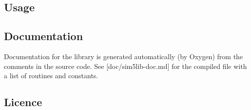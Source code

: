 \subsection*{Usage}

\subsection*{Documentation}

Documentation for the library is generated automatically (by Oxygen) from the comments in the source code. See \mbox{[}doc/sim5lib-\/doc.\+md\mbox{]} for the compiled file with a list of routines and constants.

\subsection*{Licence}